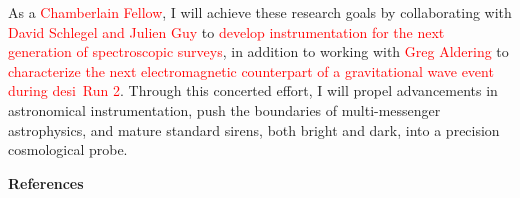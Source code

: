 \documentclass[11pt]{article}
\newcommand{\tcolor}{red}
\newcommand{\TODO}[1]{%
  \marginnote{\color{red}\textbf{TODO}}%
  {\color{red}#1}%
}
\newcommand{\hindex}{8}
\newcommand{\hindexDate}{August 2026}
\newcommand{\DESI}{\ac{desi}}
\newcommand{\Institute}{\textcolor{\tcolor}{Lawrence Berkeley National Laboratory}}
\newcommand{\Position}{\textcolor{\tcolor}{Chamberlain Fellow}}
\begin{document}
As a \Position, I will achieve these research goals by collaborating with \textcolor{\tcolor}{David Schlegel and Julien Guy} to \textcolor{\tcolor}{develop instrumentation for the next generation of spectroscopic surveys}, in addition to working with \textcolor{\tcolor}{Greg Aldering} to \textcolor{\tcolor}{characterize the next electromagnetic counterpart of a gravitational wave event during \DESI\ Run 2}.
Through this concerted effort, I will propel advancements in astronomical instrumentation, push the boundaries of multi-messenger astrophysics, and mature standard sirens, both bright and dark, into a precision cosmological probe.

\newpage

\textbf{References}
\renewcommand{\refname}{}
\vspace{-3\baselineskip}
{\small}
\end{document}

